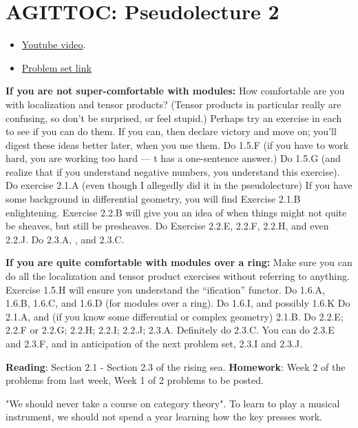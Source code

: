 \documentclass{book}
\theoremstyle{definition}
\begin{document}
\chapter{AGITTOC: Pseudolecture 2}
\begin{itemize}
\item \href{https://www.youtube.com/watch?v=mqt1f8owKrU}{Youtube video}.
\item \href{https://math216.wordpress.com/2020/07/06/readings-and-problem-set-for-after-the-second-pseudolecture/}{Problem set link}

\end{itemize}
\textbf{If you are not super-comfortable with modules:} How comfortable are
you with localization and tensor products?  (Tensor products in particular
really are confusing, so don’t be surprised, or feel stupid.)  Perhaps try an
exercise in each to see if you can do them.  If you can, then declare victory
and move on; you’ll digest these ideas better later, when you use them.
Do 1.5.F (if you have to work hard, you are working too hard — t has a
one-sentence answer.)  Do 1.5.G (and realize that if you understand negative
numbers, you understand this exercise).   Do exercise 2.1.A (even though I
allegedly did it in the pseudolecture)  If you have some background in
differential geometry, you will find Exercise 2.1.B enlightening.    Exercise
2.2.B will give you an idea of when things might not quite be sheaves, but
still be presheaves.    Do Exercise 2.2.E, 2.2.F, 2.2.H,  and even 2.2.J.  Do
2.3.A, , and 2.3.C.

\textbf{If you are quite comfortable with modules over a ring:}    Make sure
you can do all the localization and tensor product exercises without referring
to anything. Exercise 1.5.H  will ensure you understand the “ification”
functor.  Do  1.6.A, 1.6.B, 1.6.C, and 1.6.D (for modules over a ring).
Do 1.6.I, and possibly 1.6.K  Do 2.1.A, and (if you know some differential or
complex geometry) 2.1.B.    Do 2.2.E; 2.2.F or 2.2.G; 2.2.H; 2.2.I; 2.2.J;
2.3.A.  Definitely do 2.3.C.  You can do 2.3.E and 2.3.F, and in anticipation
of the next problem set, 2.3.I and 2.3.J.

\textbf{Reading}: Section 2.1 - Section 2.3 of the rising sea. \textbf{Homework}: Week 2
of the problems from last week, Week 1 of 2 problems to be posted.

"We should never take a course on category theory". To learn to play a musical
instrument, we should not spend a year learning how the key presses work.
\end{document}
